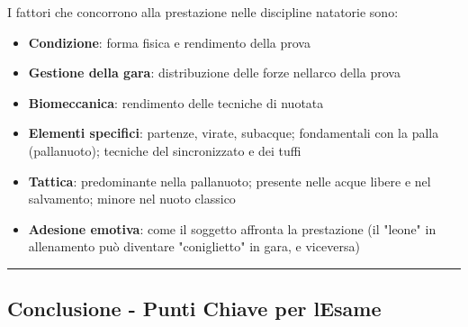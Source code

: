 \documentclass[a4paper,11pt]{article}
\providecommand{\tightlist}{%
  \setlength{\itemsep}{0pt}\setlength{\parskip}{0pt}}
\begin{document}
I fattori che concorrono alla prestazione nelle discipline natatorie
sono:

\begin{itemize}
      \tightlist
      \item
            \textbf{Condizione}: forma fisica e rendimento della prova
      \item
            \textbf{Gestione della gara}: distribuzione delle forze
            nell\textquotesingle arco della prova
      \item
            \textbf{Biomeccanica}: rendimento delle tecniche di nuotata
      \item
            \textbf{Elementi specifici}: partenze, virate, subacque; fondamentali
            con la palla (pallanuoto); tecniche del sincronizzato e dei tuffi
      \item
            \textbf{Tattica}: predominante nella pallanuoto; presente nelle acque
            libere e nel salvamento; minore nel nuoto classico
      \item
            \textbf{Adesione emotiva}: come il soggetto affronta la prestazione
            (il "leone" in allenamento può diventare "coniglietto" in gara, e
            viceversa)
\end{itemize}

\begin{center}\rule{0.5\linewidth}{0.5pt}\end{center}

\subsection{Conclusione - Punti Chiave per
      l\textquotesingle Esame}\label{conclusione---punti-chiave-per-lesame-3}
\end{document}

